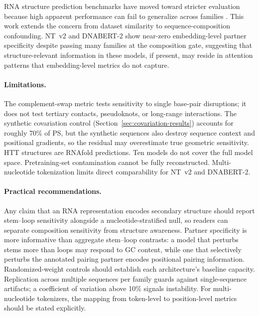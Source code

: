 \documentclass[11pt]{article}
\begin{document}
RNA structure prediction benchmarks have moved toward stricter evaluation
because high apparent performance can fail to generalize across families
\citep{szikszai2022generalization}. This work extends the concern from
dataset similarity to sequence-composition confounding. NT~v2 and DNABERT-2
show near-zero embedding-level partner specificity despite passing many
families at the composition gate, suggesting that structure-relevant
information in these models, if present, may reside in attention patterns
that embedding-level metrics do not capture.

\paragraph{Limitations.}
The complement-swap metric tests sensitivity to single base-pair disruptions;
it does not test tertiary contacts, pseudoknots, or long-range interactions.
The synthetic covariation control (Section~\ref{sec:covariation-results})
accounts for roughly 70\% of PS, but the synthetic sequences also destroy
sequence context and positional gradients, so the residual may overestimate
true geometric sensitivity. HTT structures
are RNAfold predictions. Ten models do not cover the full model space. Pretraining-set contamination cannot be
fully reconstructed. Multi-nucleotide tokenization limits direct
comparability for NT~v2 and DNABERT-2.

\paragraph{Practical recommendations.}
Any claim that an RNA representation encodes secondary structure should
report stem--loop sensitivity alongside a nucleotide-stratified null, so
readers can separate composition sensitivity from structure awareness.
Partner specificity is more informative than aggregate stem--loop contrasts:
a model that perturbs stems more than loops may respond to GC content, while
one that selectively perturbs the annotated pairing partner encodes
positional pairing information. Randomized-weight controls should establish
each architecture's baseline capacity. Replication across
multiple sequences per family guards against single-sequence artifacts; a
coefficient of variation above 10\% signals instability. For
multi-nucleotide tokenizers, the mapping from token-level to position-level
metrics should be stated explicitly.
\end{document}
